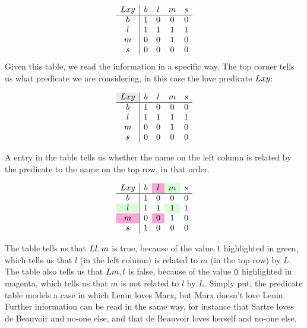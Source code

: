 \documentclass[PHIL101-Textbook.tex]{subfiles}
\begin{document}
\[\begin{array}{c|cccc}
	\mathord{L}{x y} & b & l & m & s\\ \hline
	b & 1 & 0 & 0 & 0 \\
	l & 1 & 1 & 1 & 1\\
	m & 0 & 0 & 1 & 0\\
	s & 0 & 0 & 0 & 0	
\end{array}\]
\noindent Given this table, we read the information in a specific way. The top corner tells us what predicate we are considering, in this case the love predicate $\mathord{L}{xy}$:

\[\begin{array}{c|cccc}
	\cellcolor{gray!15}\atom L {x y} & b & l & m & s\\ \hline
	b & \vT & \vF & \vF & \vF \\
	l & \vT & \vT & \vT & \vT\\
	m & \vF & \vF & \vT & \vF\\
	s & \vF & \vF & \vF & \vF	
\end{array} \]


\noindent A entry in the table tells us whether the name on the left column is related by the predicate to the name on the top row, in that order.



\[\begin{array}{c|cccc}
	\atom L {x y} & b & \cellcolor{magenta!35}l & \cellcolor{green!15}m & s\\ \hline
	b & \vT & \vF & \vF & \vF \\
	\cellcolor{green!15} l & \vT & \vT & \cellcolor{green!15}\vT & \vT\\
	\cellcolor{magenta!35}m & \vF & \cellcolor{magenta!35}\vF & \vT & \vF\\
	s & \vT & \vF & \vF & \vF	
\end{array} \]


\noindent The table tells us that $\mathord{L}{l, m}$ is true, because of the value $1$ highlighted in green, which tells us that $l$ (in the left column) is related to $m$ (in the top row) by $L$. The table also tells us that $\mathord{L}{m, l}$ is false, because of the value $0$ highlighted in magenta, which tells us that $m$ is not related to $l$ by $L$. Simply put, the predicate table models a case in which Lenin loves Marx, but Marx doesn't love Lenin. Further information can be read in the same way, for instance that Sartre loves de Beauvoir and no-one else, and that de Beauvoir loves herself and no-one else.\\
\end{document}
